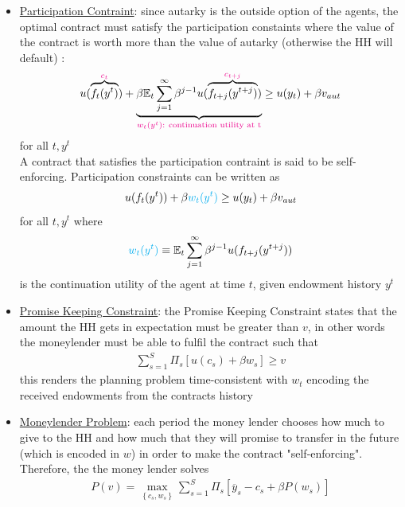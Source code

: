 \documentclass{article}
\begin{document}
\begin{itemize}
\begin{itemize}
    \end{itemize}
    \item \underline{Participation Contraint}: since autarky is the outside option of the agents, the optimal contract must satisfy the participation constaints where the value of the contract is worth more than the value of autarky (otherwise the HH will default) :
    \begin{gather*}
        u(\overbrace{f_{t}(y^{t})}^{\begingroup\color{magenta} c_{t} \endgroup}) + \underbrace{\beta \mathbb{E}_{t} \sum_{j=1}^{\infty} \beta^{j-1} u(\overbrace{f_{t+j}(y^{t+j})}^{\begingroup\color{magenta} c_{t+j} \endgroup})}_{\begingroup\color{magenta} w_{t}(y^{t}): \ \text{continuation utility at t} \endgroup} \geq u(y_{t}) + \beta v_{aut}
    \end{gather*}
    for all $t, y^{t}$ \\
    A contract that satisfies the participation contraint is said to be self-enforcing. Participation constraints can be written as
    \begin{gather*}
        u(f_{t}(y^{t})) + \beta \begingroup\color{cyan} w_{t}(y^{t}) \endgroup \geq u(y_{t}) + \beta v_{aut}
    \end{gather*}
    for all $t, y^{t}$ where
    \begin{gather*}
        \begingroup\color{cyan} w_{t}(y^{t}) \endgroup \equiv \mathbb{E}_{t} \sum_{j=1}^{\infty} \beta^{j-1} u(f_{t+j} (y^{t+j}))
    \end{gather*}
    is the continuation utility of the agent at time $t$, given endowment history $y^{t}$
    \item  \underline{Promise Keeping Constraint}: the Promise Keeping Constraint states that the amount the HH gets in expectation must be greater than $v$, in other words the moneylender must be able to fulfil the contract such that
    \begin{gather*}
        \sum_{s=1}^{S} \Pi_{s} [u(c_{s}) + \beta w_{s}] \geq v
    \end{gather*}
    this renders the planning problem time-consistent with $w_{t}$ encoding the received endowments from the contracts history
    \item  \underline{Moneylender Problem}: each period the money lender chooses how much to give to the HH and how much that they will promise to transfer in the future (which is encoded in $w$) in order to make the contract "self-enforcing". Therefore, the the money lender solves
    \begin{gather*}
        P(v) = \max_{\left\{ c_{s}, w_{s} \right\} } \sum_{s=1}^{S} \Pi_{s} [\overline{y}_{s} - c_{s} + \beta P(w_{s})]

\end{gather*}
\end{itemize}
\end{document}

